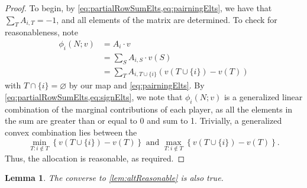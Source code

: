 \documentclass[12pt,letterpaper,final]{article}
\theoremstyle{plain}
\theoremstyle{plain}
\theoremstyle{plain}
\newtheorem{lemma}[theorem]{Lemma}
\theoremstyle{plain}
\theoremstyle{plain}
\theoremstyle{plain}
\theoremstyle{plain}
\theoremstyle{definition}
\theoremstyle{definition}
\theoremstyle{definition}
\theoremstyle{definition}
\theoremstyle{definition}
\theoremstyle{remark}
\theoremstyle{remark}
\theoremstyle{remark}
\theoremstyle{remark}
\begin{document}
\begin{proof}
  To begin, by \cref{eq:partialRowSumElts,eq:pairningElts}, we have
  that \(\sum_{T} A_{i,T}=-1\), and all elements of the matrix are
  determined. To check for reasonableness,
  note 
  \begin{align*}
    \phi_i(N;v) & = A_i \cdot v\\
                & = \sum_S A_{i,S} \cdot v(S)\\
                & =  \sum_{T} A_{i,T\cup \{i\}}\left(v(T\cup \{i\}) - v(T)\right)
  \end{align*}
  with \(T\cap \{i\} = \varnothing\) by our map and
  \cref{eq:pairningElts}. By \cref{eq:partialRowSumElts,eq:signElts}, we note that
  \(\phi_i(N;v)\) is a generalized linear combination of the
  marginal contributions of each player, as all the elements in the
  sum are greater than or equal to 0 and sum to 1. 
  Trivially, a generalized convex
  combination lies between the
  \[
    \min_{T: i\notin T}\left\{ v\left(T \cup\{i\}\right) -v(T)\right\}
    \text{ and } \max_{T: i\notin T}\left\{ v\left(T \cup\{i\}\right)
      -v(T)\right\}.
  \]
  Thus, the allocation is reasonable, as required.
\end{proof}

\begin{lemma}
  The converse to \cref{lem:altReasonable} is also true.
\end{lemma}
\end{document}
